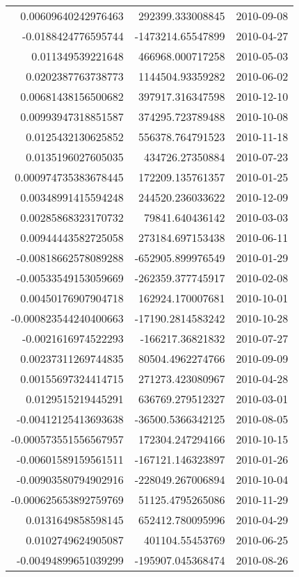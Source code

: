 \begin{tabular}{r | r | l}
0.00609640242976463 & 292399.333008845 & 2010-09-08 \\
-0.0188424776595744 & -1473214.65547899 & 2010-04-27 \\
0.011349539221648 & 466968.000717258 & 2010-05-03 \\
0.0202387763738773 & 1144504.93359282 & 2010-06-02 \\
0.00681438156500682 & 397917.316347598 & 2010-12-10 \\
0.00993947318851587 & 374295.723789488 & 2010-10-08 \\
0.0125432130625852 & 556378.764791523 & 2010-11-18 \\
0.0135196027605035 & 434726.27350884 & 2010-07-23 \\
0.000974735383678445 & 172209.135761357 & 2010-01-25 \\
0.00348991415594248 & 244520.236033622 & 2010-12-09 \\
0.00285868323170732 & 79841.640436142 & 2010-03-03 \\
0.00944443582725058 & 273184.697153438 & 2010-06-11 \\
-0.00818662578089288 & -652905.899976549 & 2010-01-29 \\
-0.00533549153059669 & -262359.377745917 & 2010-02-08 \\
0.00450176907904718 & 162924.170007681 & 2010-10-01 \\
-0.000823544240400663 & -17190.2814583242 & 2010-10-28 \\
-0.0021616974522293 & -166217.36821832 & 2010-07-27 \\
0.00237311269744835 & 80504.4962274766 & 2010-09-09 \\
0.00155697324414715 & 271273.423080967 & 2010-04-28 \\
0.0129515219445291 & 636769.279512327 & 2010-03-01 \\
-0.00412125413693638 & -36500.5366342125 & 2010-08-05 \\
-0.000573551556567957 & 172304.247294166 & 2010-10-15 \\
-0.00601589159561511 & -167121.146323897 & 2010-01-26 \\
-0.00903580794902916 & -228049.267006894 & 2010-10-04 \\
-0.000625653892759769 & 51125.4795265086 & 2010-11-29 \\
0.0131649858598145 & 652412.780095996 & 2010-04-29 \\
0.0102749624905087 & 401104.55453769 & 2010-06-25 \\
-0.00494899651039299 & -195907.045368474 & 2010-08-26 \\

\end{tabular}
